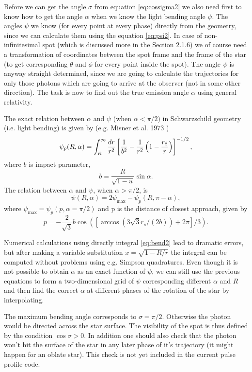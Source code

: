 \documentclass{wihuri}
\def\rg{r_{\rm S}} %
\def\be{\begin{equation}}
\def\ee{\end{equation}}
\def\rg{r_{\rm S}} %
\begin{document}
Before we can get the angle $\sigma$ from equation \ref{eq:cossigma2} we also need first to know how to get the angle $\alpha$ when we know the light bending angle $\psi$. The angles $\psi$ we know (for every point at every phase) directly from the geometry, since we can calculate them using the equation \ref{eq:psi2}. In case of non-infinitesimal spot (which is discussed more in the Section 2.1.6) we of course need a  transformation of coordinates between the spot frame and the frame of the star (to get corresponding $\theta$ and $\phi$ for every point inside the spot). The angle $\psi$ is anyway straight determined, since we are going to calculate the trajectories for only those photons which are going to arrive at the observer (not in some other direction). The task is now to find out the true emission angle $\alpha$ using general relativity. 

The exact relation between $\alpha$ and $\psi$ (when $\alpha < \pi/2$) in Schwarzschild geometry (i.e. light bending) is given by (e.g. Misner et al. 1973 \cite{mtw}) %
\be \label{eq:bend2}
  \psi_{p}(R,\alpha)=\int_R^{\infty} \frac{dr}{r^2} \left[ \frac{1}{b^2} -
       \frac{1}{r^2}\left( 1- \frac{\rg}{r}\right)\right]^{-1/2} ,
\ee
where $b$ is impact parameter,
\be \label{eq:impact2}
  b=\frac{R}{\sqrt{1-u}} \sin\alpha .
\ee
The relation between  $\alpha$ and $\psi$, when $\alpha > \pi/2$, is 
\be 
\psi(R,\alpha)=2\psi_{\max}-\psi_{p}(R,\pi-\alpha),
\ee 
where $\psi_{\max} = \psi_{p}(p,\alpha=\pi/2)$ and p is the distance of closest approach, given by
\be
p = -\frac{2}{\sqrt{3}}b\cos([\arccos(3\sqrt{3}r_{s}/(2b))+2\pi]/3).
\ee


Numerical calculations using directly integral \ref{eq:bend2} lead to dramatic errors, but after making a variable substitution $x = \sqrt{1-R/r}$ the integral can be computed without problems using e.g. Simpson quadratures. Even though it is not possible to obtain $\alpha$ as an exact function of $\psi$, we can still use the previous equations to form a two-dimensional grid of $\psi$ corresponding different $\alpha$ and $R$ and then find the correct $\alpha$ at different phases of the rotation of the star by interpolating. 



The maximum bending angle corresponds to $\sigma=\pi/2$. Otherwise the photon would be directed across the star surface. 
The visibility of the spot is thus defined by the condition $\cos \sigma>0$. In addition one should also check that the photon won't hit the surface of the star in any later phase of it's trajectory (it might happen for an oblate star). This check is not yet included in the current pulse profile code.
\end{document}
